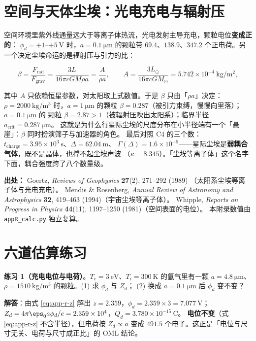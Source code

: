 \section{空间与天体尘埃：光电充电与辐射压}
\label{sec:app-r-space}

空间环境里紫外线通量远大于等离子体热流，光电发射主导充电，颗粒电位\textbf{变成正的}：
$\phi_d=+1$--$+5\ \mathrm{V}$ 时，$a=0.1\ \mathrm{\mu m}$ 的颗粒带
$69.4$、$138.9$、$347.2$ 个正电荷。另一个决定尘埃命运的是辐射压与引力的比：

\begin{equation}
  \beta = \frac{F_{\mathrm{rad}}}{F_{\mathrm{grav}}}
  = \frac{3L}{16\pi cGM\rho a}
  = \frac{A}{\rho a},
  \qquad
  A = \frac{3L_\odot}{16\pi cGM_\odot}=5.742\times10^{-4}\ \mathrm{kg/m^2},
  \label{eq:app-r-beta}
\end{equation}

其中 $A$ 只依赖恒星参数，对太阳取上式数值。于是 $\beta$ 只由「$\rho a$」决定：$\rho=2000\ \mathrm{kg/m^3}$
时，$a=1\ \mathrm{\mu m}$ 的颗粒 $\beta=0.287$（被引力束缚，慢慢向里落）；$a=0.1\ \mathrm{\mu m}$ 的
颗粒 $\beta=2.87>1$（被辐射压吹出太阳系）；临界半径 $a_{\mathrm{crit}}=0.287\ \mathrm{\mu m}$。
这就是为什么行星际尘埃的尺度分布在小半径端有一个「悬崖」：$\beta$ 同时扮演筛子与加速器的角色。
最后对照 C4 的三个数：$t_{\mathrm{charge}}=3.95\times10^{3}\ \mathrm{s}$、$\Delta=62.04\ \mathrm{m}$、
$\Gamma(\Delta)=1.6\times10^{-5}$——星际尘埃是\textbf{弱耦合气体}，既不是晶体，也撑不起尘埃声波
（$\kappa=8.345$）。「尘埃等离子体」这个名字下面，耦合强度跨了八个数量级。

{\footnotesize
\textbf{出处：} Goertz, \emph{Reviews of Geophysics} \textbf{27}(2), 271--292 (1989)
（太阳系尘埃等离子体与光电充电）。
Mendis \& Rosenberg, \emph{Annual Review of Astronomy and
Astrophysics} \textbf{32}, 419--463 (1994)（宇宙尘埃等离子体）。
Whipple, \emph{Reports on
Progress in Physics} \textbf{44}(11), 1197--1250 (1981)（空间表面的电位）。
本附录数值由
\texttt{appR\_calc.py} 独立复算。
}

\section{六道估算练习}
\label{sec:app-r-problems}


\textbf{练习 1（充电电位与电荷）}。$T_e=3\ \mathrm{eV}$、$T_i=300\ \mathrm{K}$ 的氩气里有一颗
$a=4.8\ \mathrm{\mu m}$、$\rho=1510\ \mathrm{kg/m^3}$ 的颗粒。(1) 求 $\phi_d$ 与 $Z_d$；
(2) 换成 $a=0.1\ \mathrm{\mu m}$ 后 $\phi_d$ 变不变？

\textbf{解答}：由式 \eqref{eq:app-r-z} 解出 $z=2.359$，$\phi_d=2.359\times3=7.077\ \mathrm{V}$；
$Z_d=4\pi\eps_0a\phi_d/e=2.359\times10^{4}$，$Q_d=3.780\times10^{-15}\ \mathrm{C}$。
\textbf{电位不变}（式 \eqref{eq:app-r-z} 不含半径），但电荷按 $Z_d\propto a$ 变成
$491.5$ 个电子。这正是「电位与尺寸无关、电荷与尺寸成正比」的 OML 结论。

